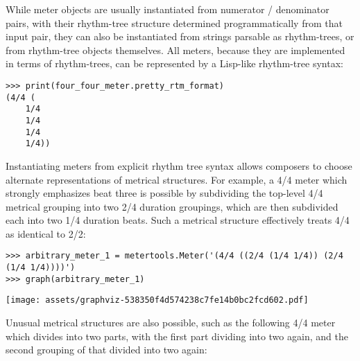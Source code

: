 \noindent While meter objects are usually instantiated from numerator /
denominator pairs, with their rhythm-tree structure determined programmatically
from that input pair, they can also be instantiated from strings parsable as
rhythm-trees, or from rhythm-tree objects themselves. All meters, because they
are implemented in terms of rhythm-trees, can be represented by a Lisp-like
rhythm-tree syntax:

\begin{comment}
<abjad>
print(four_four_meter.pretty_rtm_format)
</abjad>
\end{comment}

\begin{singlespacing}
\vspace{-0.5\baselineskip}
\begin{lstlisting}
>>> print(four_four_meter.pretty_rtm_format)
(4/4 (
	1/4
	1/4
	1/4
	1/4))
\end{lstlisting}
\end{singlespacing}

\noindent Instantiating meters from explicit rhythm tree syntax allows
composers to choose alternate representations of metrical structures. For
example, a 4/4 meter which strongly emphasizes beat three is possible by
subdividing the top-level 4/4 metrical grouping into two 2/4 duration
groupings, which are then subdivided each into two 1/4 duration beats. Such a
metrical structure effectively treats 4/4 as identical to 2/2:

\begin{comment}
<abjad>
arbitrary_meter_1 = metertools.Meter('(4/4 ((2/4 (1/4 1/4)) (2/4 (1/4 1/4))))')
graph(arbitrary_meter_1)
</abjad>
\end{comment}

\begin{singlespacing}
\vspace{-0.5\baselineskip}
\begin{lstlisting}
>>> arbitrary_meter_1 = metertools.Meter('(4/4 ((2/4 (1/4 1/4)) (2/4 (1/4 1/4))))')
>>> graph(arbitrary_meter_1)
\end{lstlisting}
\noindent\texttt{[image: assets/graphviz-538350f4d574238c7fe14b0bc2fcd602.pdf]}
\end{singlespacing}

\noindent Unusual metrical structures are also possible, such as the following
4/4 meter which divides into two parts, with the first part dividing into two
again, and the second grouping of that divided into two again:

